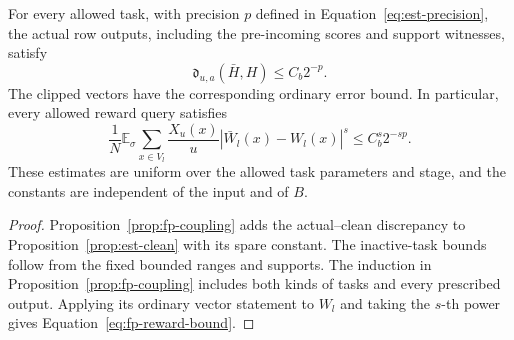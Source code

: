 \begin{theorem}
\label{thm:fp-estimators}
For every allowed task, with precision $p$ defined in
Equation~\eqref{eq:est-precision}, the actual row outputs, including the
pre-incoming scores and support witnesses, satisfy
\[
                \mathfrak d_{u,a}(\bar H,H)\le C_b2^{-p}.
\]
The clipped vectors have the corresponding ordinary error bound.
In particular, every allowed reward query satisfies
\begin{equation}
 \frac1N\mathbb E_\sigma\sum_{x\in V_l}\frac{X_u(x)}u
           |\bar W_l(x)-W_l(x)|^s\le C_b^s2^{-sp}.
 \label{eq:fp-reward-bound}
\end{equation}
These estimates are uniform over the allowed task parameters and stage,
and the constants are independent of the input and of $B$.
\end{theorem}

\begin{proof}
Proposition~\ref{prop:fp-coupling} adds the actual--clean discrepancy
to Proposition~\ref{prop:est-clean} with its spare constant.  The
inactive-task bounds follow from the fixed bounded ranges and supports.
The induction in Proposition~\ref{prop:fp-coupling} includes both kinds
of tasks and every prescribed output.  Applying its ordinary vector
statement to $W_l$ and taking the $s$-th power gives
Equation~\eqref{eq:fp-reward-bound}.
\end{proof}

